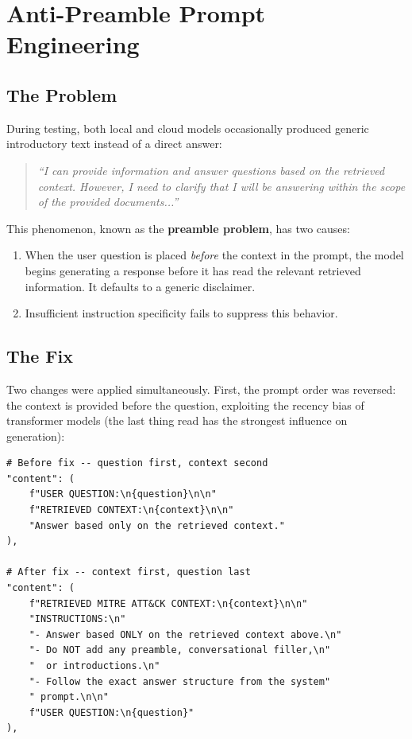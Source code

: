 \documentclass[12pt,a4paper]{report}
\begin{document}
\section{Anti-Preamble Prompt Engineering}

\subsection{The Problem}

During testing, both local and cloud models occasionally produced generic introductory text instead of a direct answer:

\begin{quote}
\textit{``I can provide information and answer questions based on the retrieved context. However, I need to clarify that I will be answering within the scope of the provided documents...''}
\end{quote}

This phenomenon, known as the \textbf{preamble problem}, has two causes:

\begin{enumerate}
    \item When the user question is placed \emph{before} the context in the prompt, the model begins generating a response before it has read the relevant retrieved information. It defaults to a generic disclaimer.
    \item Insufficient instruction specificity fails to suppress this behavior.
\end{enumerate}

\subsection{The Fix}

Two changes were applied simultaneously. First, the prompt order was reversed: the context is provided before the question, exploiting the recency bias of transformer models (the last thing read has the strongest influence on generation):

\begin{lstlisting}[style=pythonstyle]
# Before fix -- question first, context second
"content": (
    f"USER QUESTION:\n{question}\n\n"
    f"RETRIEVED CONTEXT:\n{context}\n\n"
    "Answer based only on the retrieved context."
),

# After fix -- context first, question last
"content": (
    f"RETRIEVED MITRE ATT&CK CONTEXT:\n{context}\n\n"
    "INSTRUCTIONS:\n"
    "- Answer based ONLY on the retrieved context above.\n"
    "- Do NOT add any preamble, conversational filler,\n"
    "  or introductions.\n"
    "- Follow the exact answer structure from the system"
    " prompt.\n\n"
    f"USER QUESTION:\n{question}"
),
\end{lstlisting}
\end{document}
